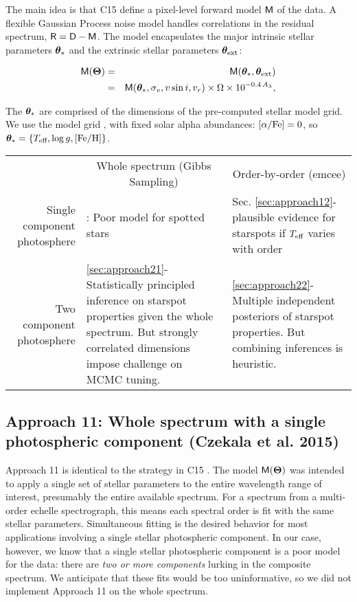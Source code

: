 \documentclass[onecolumn]{emulateapj}%
\newcommand{\iancze}{{\sc C15 }}
\begin{document}
The main idea is that \iancze define a pixel-level forward model $\mathsf{M}$ of the data.  A flexible Gaussian Process noise model handles correlations in the residual spectrum, $\mathsf{R}= \mathsf{D} - \mathsf{M}$.  The model encapsulates the major intrinsic stellar parameters ${\bm \theta}_{\ast}$ and the extrinsic stellar parameters ${\bm \theta}_{\rm ext}$:

\begin{eqnarray} \label{eqn:scaling}
\mathsf{M}({\bm \Theta}) &=& \mathsf{M}({\bm \theta}_{\ast}, {\bm \theta}_{\rm ext}) \\
         &=& \mathsf{M}({\bm \theta}_{\ast}, \sigma_v, v\sin{i}, v_r) \times \Omega \times 10^{-0.4\,A_{\lambda}}, \nonumber
\end{eqnarray}

The ${\bm \theta}_{\ast}$ are comprised of the dimensions of the pre-computed stellar model grid.  We use the \PHOENIX model grid \citep{2013A&A...553A...6H}, with fixed solar alpha abundances: $[\alpha/{\rm Fe}] = 0$, so ${\bm \theta}_{\ast} = \{T_\textrm{eff}, \log g, [{\rm Fe}/{\rm H}] \}$.


\begin{tabular}{ r| p{5cm} | p{5cm} | }
\multicolumn{1}{r}{}
 &  \multicolumn{1}{c}{Whole spectrum (Gibbs Sampling)}
 & \multicolumn{1}{c}{Order-by-order (emcee)} \\
\cline{2-3}
Single component photosphere & \citet{2015ApJ...812..128C}: Poor model for spotted stars & Sec. \ref{sec:approach12}- plausible evidence for starspots if $T_\textrm{eff}$ varies with order \\
\cline{2-3}
Two component photosphere & \ref{sec:approach21}- Statistically principled inference on starspot properties given the whole spectrum.  But strongly correlated dimensions impose challenge on MCMC tuning. & \ref{sec:approach22}- Multiple independent posteriors of starspot properties.  But combining inferences is heuristic.  \\
\cline{2-3}
\end{tabular}

\subsection{Approach 11: Whole spectrum with a single photospheric component (Czekala et al. 2015)}

Approach 11 is identical to the strategy in \iancze.  The model $\mathsf{M}({\bm \Theta})$ was intended to apply a single set of stellar parameters to the entire wavelength range of interest, presumably the entire available spectrum.  For a spectrum from a multi-order echelle spectrograph, this means each spectral order is fit with the same stellar parameters.  Simultaneous fitting is the desired behavior for most applications involving a single stellar photospheric component.  In our case, however, we know that a single stellar photospheric component is a poor model for the data: there are \emph{two or more components} lurking in the composite spectrum.  We anticipate that these fits would be too uninformative, so we did not implement Approach 11 on the whole spectrum.
\end{document}
